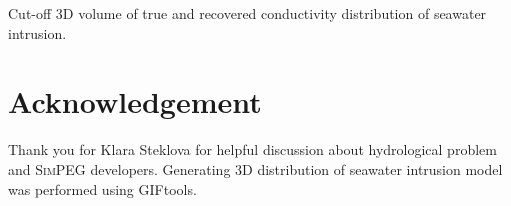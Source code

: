 \documentclass{segabs}
\newcommand{\SimPEG}{\textsc{SimPEG}\xspace}
\begin{document}
{Cut-off 3D volume of true and recovered conductivity distribution of seawater intrusion.}





\section{Acknowledgement}
Thank you for Klara Steklova for helpful discussion about hydrological problem and  \SimPEG developers. Generating 3D distribution of seawater intrusion model was performed using GIFtools.

\twocolumn
\onecolumn
% 

\end{document}
